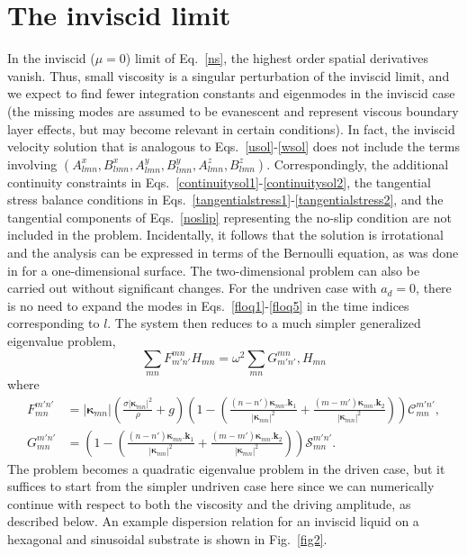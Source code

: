 \documentclass[aps,pre,amsmath,amssymb,floatfix,onecolumn,notitlepage,10pt]{revtex4-1}
\begin{document}
\section{The inviscid limit}
In the inviscid ($\mu=0$) limit of Eq.~\eqref{ns}, the highest order spatial derivatives vanish. Thus, small viscosity is a singular perturbation of the inviscid limit, and we expect to find fewer integration constants and eigenmodes in the inviscid case (the missing modes are assumed to be evanescent and represent viscous boundary layer effects, but may become relevant in certain conditions). In fact, the inviscid velocity solution that is analogous to Eqs.~\eqref{usol}-\eqref{wsol} does not include the terms involving $(A_{lmn}^x,B_{lmn}^x,A_{lmn}^y,B_{lmn}^y, A_{lmn}^z, B_{lmn}^z)$. Correspondingly, the additional continuity constraints in Eqs.~\eqref{continuitysol1}-\eqref{continuitysol2}, the tangential stress balance conditions in Eqs.~\eqref{tangentialstress1}-\eqref{tangentialstress2}, and the tangential components of Eqs.~\eqref{noslip} representing the no-slip condition are not included in the problem. Incidentally, it follows that the solution is irrotational and the analysis can be expressed in terms of the Bernoulli equation, as was done in \cite{2021_Nicolaou_1} for a one-dimensional surface. The two-dimensional problem can also be carried out without significant changes. For the undriven case with $a_d=0$, there is no need to expand the modes in Eqs.~\eqref{floq1}-\eqref{floq5} in the time indices corresponding to $l$. The system then reduces to a much simpler generalized eigenvalue problem,
\begin{equation}
\sum_{mn} F^{mn}_{m'n'} H_{mn} = \omega^2 \sum_{mn} G^{mn}_{m'n'}, H_{mn}
\end{equation}
where
\begin{align}
F^{m'n'}_{mn}&=\left| \bm{\kappa}_{mn}\right| \left(\frac{\sigma  \left| \bm{\kappa}_{mn}\right| ^2}{\rho }+g\right)  \left(1- \left(\frac{({n}-{n'}) \bm{\kappa}_{mn}.\mathbf{k}_1}{\left| \bm{\kappa}_{mn}\right| ^2}+\frac{({m}-{m'}) \bm{\kappa}_{mn}.\mathbf{k}_2}{\left| \bm{\kappa}_{mn}\right| ^2}\right)\right) \mathcal{C}^{m'n'}_{mn}, \\
G^{m'n'}_{mn}&=  \left(1- \left(\frac{({n}-{n'}) \bm{\kappa}_{mn}.\mathbf{k}_1}{\left| \bm{\kappa}_{mn}\right| ^2}+\frac{({m}-{m'}) \bm{\kappa}_{mn}.\mathbf{k}_2}{\left| \bm{\kappa}_{mn}\right| ^2}\right)\right) \mathcal{S}^{m'n'}_{mn}.
\end{align}
The problem becomes a quadratic eigenvalue problem in the driven case, but it suffices to start from the simpler undriven case here since we can numerically continue with respect to both the viscosity and the driving amplitude, as described below. An example dispersion relation for an inviscid liquid on a hexagonal and sinusoidal substrate is shown in Fig.~\ref{fig2}.
\end{document}
